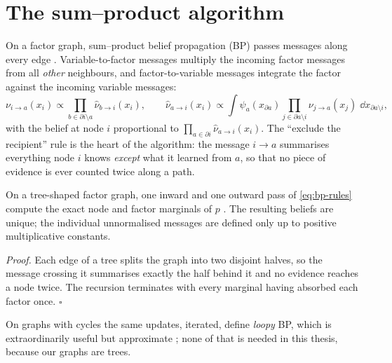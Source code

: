 \section{The sum--product algorithm}\label{sec:sum-product}

On a factor graph, sum--product belief propagation (BP) passes messages
along every edge \citep{pearl1988probabilistic, kschischang2001factor,
mezard2009information}. Variable-to-factor messages multiply the
incoming factor messages from all \emph{other} neighbours, and
factor-to-variable messages integrate the factor against the incoming
variable messages:
\begin{equation}
  \nu_{i \to a}(x_i) \propto
    \prod_{b \in \partial i \setminus a} \hat\nu_{b \to i}(x_i),
  \qquad
  \hat\nu_{a \to i}(x_i) \propto
    \int \psi_a(x_{\partial a})
    \prod_{j \in \partial a \setminus i} \nu_{j \to a}(x_j)\;
    \dd x_{\partial a \setminus i},
  \label{eq:bp-rules}
\end{equation}
with the belief at node $i$ proportional to
$\prod_{a \in \partial i} \hat\nu_{a \to i}(x_i)$. The ``exclude the
recipient'' rule is the heart of the algorithm: the message $i \to a$
summarises everything node $i$ knows \emph{except} what it learned from
$a$, so that no piece of evidence is ever counted twice along a path.

\begin{theorem}\label{thm:tree-exact}
On a tree-shaped factor graph, one inward and one outward pass of
\eqref{eq:bp-rules} compute the exact node and factor marginals of $p$
\citep[Theorem~14.1]{mezard2009information}. The resulting beliefs are
unique; the individual unnormalised messages are defined only up to positive
multiplicative constants.
\end{theorem}

\emph{Proof.} Each edge of a tree splits the graph into two disjoint halves, so
the message crossing it summarises exactly the half behind it and no evidence
reaches a node twice. The recursion terminates with every marginal having
absorbed each factor once. \hfill$\square$

 On graphs with cycles the same updates,
iterated, define \emph{loopy} BP, which is extraordinarily useful but
approximate \citep{weiss2001correctness, malioutov2006walk}; none of that
is needed in this thesis, because our graphs are trees.

